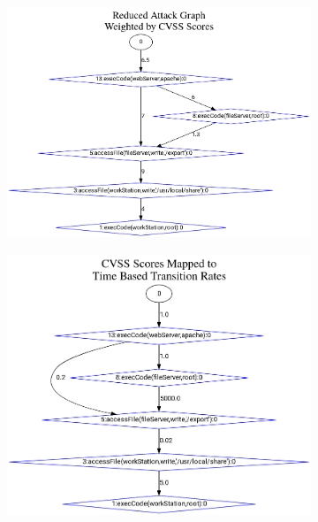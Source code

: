 \begin{figure}[ht]
    \begin{subfigure}[t]{.48\textwidth}
        \includegraphics[width=\linewidth]{resource/img/ch_automation/from_ares_paper/ag_weight_mapped_time.png}
        \caption{}
        \label{fig:gm_002}
    \end{subfigure}
    \begin{subfigure}[t]{0.48\textwidth}
        \includegraphics[width=\linewidth]{resource/img/ch_automation/from_ares_paper/map_time.png}
        \caption{} 
        \label{fig:gm_001}
    \end{subfigure}


\end{figure}
